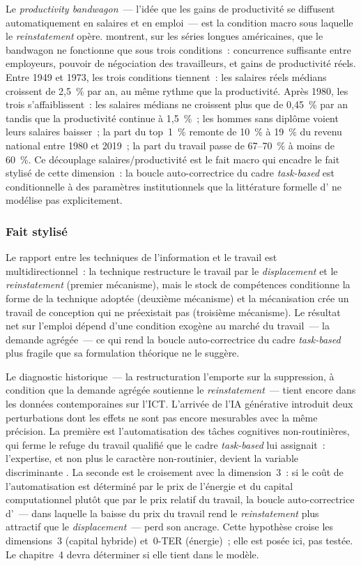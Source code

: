 Le \emph{productivity bandwagon}~--- l'idée que les gains de productivité se diffusent automatiquement en salaires et en emploi~--- est la condition macro sous laquelle le \emph{reinstatement} opère. \textcite{acemoglu_power_2023} montrent, sur les séries longues américaines, que le bandwagon ne fonctionne que sous trois conditions~: concurrence suffisante entre employeurs, pouvoir de négociation des travailleurs, et gains de productivité réels. Entre 1949 et 1973, les trois conditions tiennent~: les salaires réels médians croissent de 2,5~\% par an, au même rythme que la productivité. Après 1980, les trois s'affaiblissent~: les salaires médians ne croissent plus que de 0,45~\% par an tandis que la productivité continue à 1,5~\%~; les hommes sans diplôme voient leurs salaires baisser~; la part du top~1~\% remonte de 10~\% à 19~\% du revenu national entre 1980 et 2019~; la part du travail passe de 67--70~\% à moins de 60~\%. Ce découplage salaires/productivité est le fait macro qui encadre le fait stylisé de cette dimension~: la boucle auto-correctrice du cadre \emph{task-based} est conditionnelle à des paramètres institutionnels que la littérature formelle d'\textcite{acemoglu_race_2018} ne modélise pas explicitement.


\subsubsection{Fait stylisé}

Le rapport entre les techniques de l'information et le travail est multidirectionnel~: la technique restructure le travail par le \emph{displacement} et le \emph{reinstatement} (premier mécanisme), mais le stock de compétences conditionne la forme de la technique adoptée (deuxième mécanisme) et la mécanisation crée un travail de conception qui ne préexistait pas (troisième mécanisme). Le résultat net sur l'emploi dépend d'une condition exogène au marché du travail~--- la demande agrégée~--- ce qui rend la boucle auto-correctrice du cadre \emph{task-based} plus fragile que sa formulation théorique ne le suggère.

Le diagnostic historique~--- la restructuration l'emporte sur la suppression, à condition que la demande agrégée soutienne le \emph{reinstatement}~--- tient encore dans les données contemporaines sur l'ICT. L'arrivée de l'IA générative introduit deux perturbations dont les effets ne sont pas encore mesurables avec la même précision. La première est l'automatisation des tâches cognitives non-routinières, qui ferme le refuge du travail qualifié que le cadre \emph{task-based} lui assignait~: l'expertise, et non plus le caractère non-routinier, devient la variable discriminante \parencite{autor_expertise_2025}. La seconde est le croisement avec la dimension~3~: si le coût de l'automatisation est déterminé par le prix de l'énergie et du capital computationnel plutôt que par le prix relatif du travail, la boucle auto-correctrice d'\textcite{acemoglu_race_2018}~--- dans laquelle la baisse du prix du travail rend le \emph{reinstatement} plus attractif que le \emph{displacement}~--- perd son ancrage. Cette hypothèse croise les dimensions~3 (capital hybride) et~0-TER (énergie)~; elle est posée ici, pas testée. Le chapitre~4 devra déterminer si elle tient dans le modèle.

